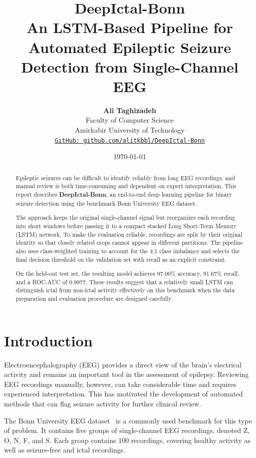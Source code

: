 \documentclass[11pt,a4paper]{article}
\title{\textbf{DeepIctal-Bonn}\\[0.4em]
	\large An LSTM-Based Pipeline for Automated Epileptic Seizure Detection from Single-Channel EEG}
\author{
	\textbf{Ali Taghizadeh}\\[0.35em]
	Faculty of Computer Science\\
	Amirkabir University of Technology\\[0.5em]
	\small
	\href{https://github.com/alitkbbl/DeepIctal-Bonn}
	{\texttt{GitHub: github.com/alitkbbl/DeepIctal-Bonn}}
}
\date{\today}
\begin{document}
	
	\maketitle
	\vspace{-1em}



\begin{abstract}
Epileptic seizures can be difficult to identify reliably from long EEG recordings, and manual review is both time-consuming and dependent on expert interpretation. This report describes \textbf{DeepIctal-Bonn}, an end-to-end deep learning pipeline for binary seizure detection using the benchmark Bonn University EEG dataset.

The approach keeps the original single-channel signal but reorganizes each recording into short windows before passing it to a compact stacked Long Short-Term Memory (LSTM) network. To make the evaluation reliable, recordings are split by their original identity so that closely related crops cannot appear in different partitions. The pipeline also uses class-weighted training to account for the 4:1 class imbalance and selects the final decision threshold on the validation set with recall as an explicit constraint.

On the held-out test set, the resulting model achieves 97.00\% accuracy, 91.67\% recall, and a ROC-AUC of 0.9977. These results suggest that a relatively small LSTM can distinguish ictal from non-ictal activity effectively on this benchmark when the data preparation and evaluation procedure are designed carefully.
\end{abstract}

\newpage
\tableofcontents
\newpage

\section{Introduction}

Electroencephalography (EEG) provides a direct view of the brain's electrical activity and remains an important tool in the assessment of epilepsy. Reviewing EEG recordings manually, however, can take considerable time and requires experienced interpretation. This has motivated the development of automated methods that can flag seizure activity for further clinical review.

The Bonn University EEG dataset~\cite{andrzejak2001} is a commonly used benchmark for this type of problem. It contains five groups of single-channel EEG recordings, denoted Z, O, N, F, and S. Each group contains 100 recordings, covering healthy activity as well as seizure-free and ictal recordings.
\end{document}
